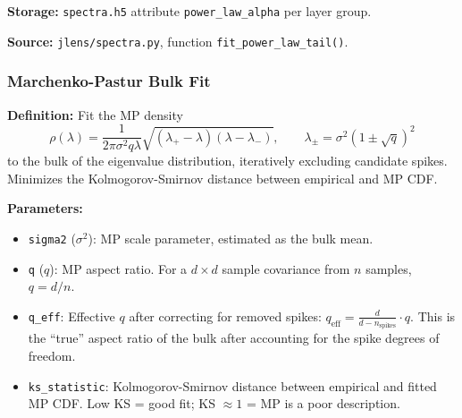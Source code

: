 \documentclass[11pt,a4paper]{article}
\begin{document}
\textbf{Storage:} \texttt{spectra.h5} attribute \texttt{power\_law\_alpha} per layer group.

\textbf{Source:} \texttt{jlens/spectra.py}, function \texttt{fit\_power\_law\_tail()}.

\subsubsection{Marchenko-Pastur Bulk Fit}
\label{sec:mp}

\textbf{Definition:} Fit the MP density
\begin{equation}
  \rho(\lambda) = \frac{1}{2\pi\sigma^2 q \lambda}\sqrt{(\lambda_+ - \lambda)(\lambda - \lambda_-)},
  \qquad
  \lambda_\pm = \sigma^2(1 \pm \sqrt{q})^2
\end{equation}
to the bulk of the eigenvalue distribution, iteratively excluding candidate spikes. Minimizes the Kolmogorov-Smirnov distance between empirical and MP CDF.

\textbf{Parameters:}
\begin{itemize}
  \item \texttt{sigma2} ($\sigma^2$): MP scale parameter, estimated as the bulk mean.
  \item \texttt{q} ($q$): MP aspect ratio. For a $d \times d$ sample covariance from $n$ samples, $q = d/n$.
  \item \texttt{q\_eff}: Effective $q$ after correcting for removed spikes: $q_{\text{eff}} = \frac{d}{d - n_{\text{spikes}}} \cdot q$. This is the ``true'' aspect ratio of the bulk after accounting for the spike degrees of freedom.
  \item \texttt{ks\_statistic}: Kolmogorov-Smirnov distance between empirical and fitted MP CDF. Low KS = good fit; KS $\approx 1$ = MP is a poor description.
\end{itemize}
\end{document}
